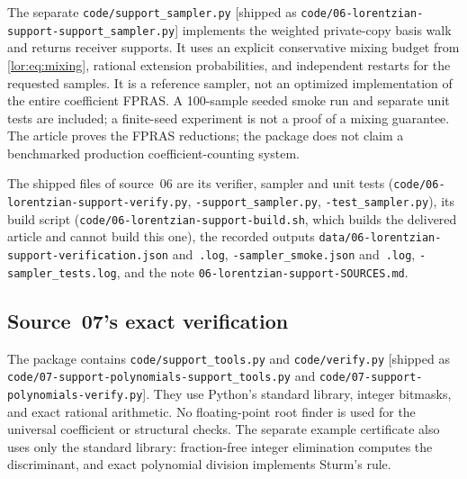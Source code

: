 \documentclass[11pt]{article}
\numberwithin{equation}{section}
\theoremstyle{definition}
\begin{document}
The separate \nolinkurl{code/support_sampler.py} [shipped as
\nolinkurl{code/06-lorentzian-support-support_sampler.py}] implements the weighted
private-copy basis walk and returns receiver supports. It uses an explicit
conservative mixing budget from \eqref{lor:eq:mixing}, rational extension
probabilities, and independent restarts for the requested samples. It is a
reference sampler, not an optimized implementation of the entire
coefficient FPRAS. A 100-sample seeded smoke run and separate unit tests
are included; a finite-seed experiment is not a proof of a mixing guarantee. The article proves the FPRAS reductions; the package
does not claim a benchmarked production coefficient-counting system.

The shipped files of source~06 are its verifier, sampler and unit tests
(\nolinkurl{code/06-lorentzian-support-verify.py},
\nolinkurl{-support_sampler.py}, \nolinkurl{-test_sampler.py}), its build
script (\nolinkurl{code/06-lorentzian-support-build.sh}, which builds the
delivered article and cannot build this one), the recorded outputs
\nolinkurl{data/06-lorentzian-support-verification.json} and~\nolinkurl{.log},
\nolinkurl{-sampler_smoke.json} and~\nolinkurl{.log},
\nolinkurl{-sampler_tests.log}, and the note
\nolinkurl{06-lorentzian-support-SOURCES.md}.

\subsection{Source~07's exact verification}
\label{lor:sp:sec:verification}

The package contains \texttt{code/support\_tools.py} and
\texttt{code/verify.py} [shipped as \nolinkurl{code/07-support-polynomials-support_tools.py}
and \nolinkurl{code/07-support-polynomials-verify.py}]. They use Python's standard library, integer bitmasks,
and exact rational arithmetic. No floating-point root finder is used for the
universal coefficient or structural checks. The separate example certificate
also uses only the standard library: fraction-free integer elimination computes
the discriminant, and exact polynomial division implements Sturm's rule.
\end{document}
